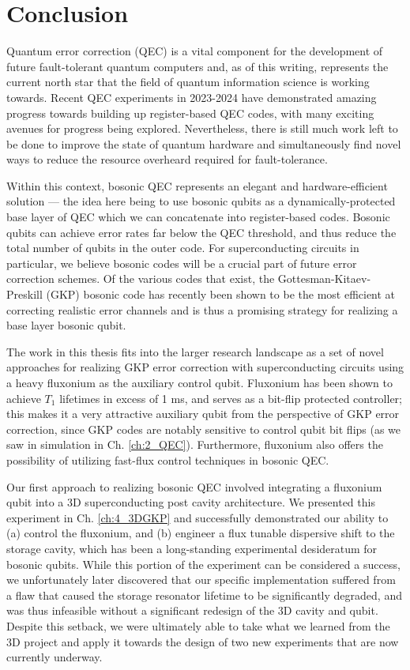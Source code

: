 \chapter{Conclusion\label{ch:6_Conclusion}}

Quantum error correction (QEC) is a vital component for the development of future fault-tolerant quantum computers and, as of this writing, represents the current north star that the field of quantum information science is working towards. Recent QEC experiments in 2023-2024 have demonstrated amazing progress towards building up register-based QEC codes, with many exciting avenues for progress being explored. Nevertheless, there is still much work left to be done to improve the state of quantum hardware and simultaneously find novel ways to reduce the resource overheard required for fault-tolerance. 

Within this context, bosonic QEC represents an elegant and hardware-efficient solution --- the idea here being to use bosonic qubits as a dynamically-protected base layer of QEC which we can concatenate into register-based codes. Bosonic qubits can achieve error rates far below the QEC threshold, and thus reduce the total number of qubits in the outer code. For superconducting circuits in particular, we believe bosonic codes will be a crucial part of future error correction schemes. Of the various codes that exist, the Gottesman-Kitaev-Preskill (GKP) bosonic code has recently been shown to be the most efficient at correcting realistic error channels and is thus a promising strategy for realizing a base layer bosonic qubit.  

The work in this thesis fits into the larger research landscape as a set of novel approaches for realizing GKP error correction with superconducting circuits using a heavy fluxonium as the auxiliary control qubit. Fluxonium has been shown to achieve $T_1$ lifetimes in excess of 1 ms, and serves as a bit-flip protected controller; this makes it a very attractive auxiliary qubit from the perspective of GKP error correction, since GKP codes are notably sensitive to control qubit bit flips (as we saw in simulation in Ch. \ref{ch:2_QEC}). Furthermore, fluxonium also offers the possibility of utilizing fast-flux control techniques in bosonic QEC. 

Our first approach to realizing bosonic QEC involved integrating a fluxonium qubit into a 3D superconducting post cavity architecture. We presented this experiment in Ch. \ref{ch:4_3DGKP} and successfully demonstrated our ability to (a) control the fluxonium, and (b) engineer a flux tunable dispersive shift to the storage cavity, which has been a long-standing experimental desideratum for bosonic qubits. While this portion of the experiment can be considered a success, we unfortunately later discovered that our specific implementation suffered from a flaw that caused the storage resonator lifetime to be significantly degraded, and was thus infeasible without a significant redesign of the 3D cavity and qubit. Despite this setback, we were ultimately able to take what we learned from the 3D project and apply it towards the design of two new experiments that are now currently underway. 

